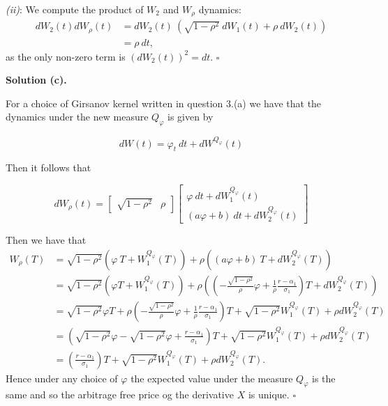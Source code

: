 \documentclass[a4paper,12pt,openany]{book}
\begin{document}
\emph{(ii)}: We compute the product of \(W_2\) and \(W_\rho\) dynamics:
\begin{align*}
dW_2(t)dW_\rho(t)&=dW_2(t)\ \left(\sqrt{1-\rho^2}\ dW_1(t)+\rho\ dW_2(t)\right)\\
&=\rho\ dt,
\end{align*}
as the only non-zero term is \((dW_2(t))^2=dt\). \(\square\)

\noindent\makebox[\linewidth]{\rule{\textwidth}{0.4pt}}

\textbf{Solution (c).}

For a choice of Girsanov kernel written in question 3.(a) we have that the dynamics under the new measure \(Q_\varphi\) is given by

\[
dW(t)=\varphi_t\ dt+dW^{Q_\varphi}(t)
\]

Then it follows that

\[
dW_\rho(t)=
\begin{bmatrix}
\sqrt{1-\rho^2} & \rho
\end{bmatrix}
\begin{bmatrix}
\varphi\ dt+dW^{Q_\varphi}_1(t)\\
(a\varphi+b)\ dt+dW^{Q_\varphi}_2(t)
\end{bmatrix}
\]

Then we have that
\begin{align*}
W_\rho(T)&=\sqrt{1-\rho^2}\left(\varphi\ T+W^{Q_\varphi}_1(T)\right)+\rho\left((a\varphi+b)\ T+dW^{Q_\varphi}_2(T)\right)\\
&=\sqrt{1-\rho^2}\left(\varphi T+W^{Q_\varphi}_1(T)\right)+\rho\left(\left(-\frac{\sqrt{1-\rho^2}}{\rho}\varphi+\frac{1}{\rho}\frac{r-\alpha_1}{\sigma_1}\right)T+dW^{Q_\varphi}_2(T)\right)\\
&=\sqrt{1-\rho^2}\varphi T+\rho\left(-\frac{\sqrt{1-\rho^2}}{\rho}\varphi+\frac{1}{\rho}\frac{r-\alpha_1}{\sigma_1}\right)T+\sqrt{1-\rho^2}W^{Q_\varphi}_1(T)+\rho dW^{Q_\varphi}_2(T)\\
&=\left(\sqrt{1-\rho^2}\varphi-\sqrt{1-\rho^2}\varphi+\frac{r-\alpha_1}{\sigma_1}\right)T+\sqrt{1-\rho^2}W^{Q_\varphi}_1(T)+\rho dW^{Q_\varphi}_2(T)\\
&=\left(\frac{r-\alpha_1}{\sigma_1}\right)T+\sqrt{1-\rho^2}W^{Q_\varphi}_1(T)+\rho dW^{Q_\varphi}_2(T).
\end{align*}
Hence under any choice of \(\varphi\) the expected value under the measure \(Q_\varphi\) is the same and so the arbitrage free price og the derivative \(X\) is unique. \(\square\)

\noindent\makebox[\linewidth]{\rule{\textwidth}{0.4pt}}
\end{document}
